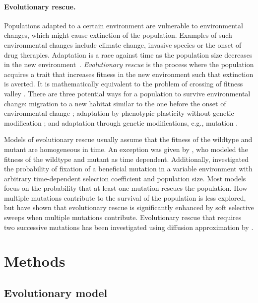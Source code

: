 \documentclass[12pt]{extarticle}
\begin{document}
\paragraph{Evolutionary rescue.} Populations adapted to a certain environment are vulnerable to environmental changes, which might cause extinction of the population. Examples of such environmental changes include climate change, invasive species or the onset of drug therapies. Adaptation is a race against time as the population size decreases in the new environment~\citep{tanaka2022surviving}. 
\emph{Evolutionary rescue} is the process where the population acquires a trait that increases fitness in the new environment such that extinction is averted. It is mathematically equivalent to the problem of crossing of fitness valley \citep{weissman2009rate,weissman2010rate}.
There are three potential ways for a population to survive environmental change: migration to a new habitat similar to the one before the onset of environmental change \citep{cobbold2020should}; adaptation by phenotypic plasticity without genetic modification \citep{carja2019evolutionary,carja2017evolutionary,levien2021non}; and adaptation through genetic modifications, e.g., mutation \citep{uecker2014evolutionary,uecker2016role,uecker2011fixation}.

Models of evolutionary rescue usually assume that the fitness of the wildtype and mutant are homogeneous in time. An exception was given by \citet{marrec2020adapt}, who modeled the fitness of the wildtype and mutant as time dependent. Additionally, \citet{uecker2011fixation} investigated the probability of fixation of a beneficial mutation in a variable environment with arbitrary time-dependent selection coefficient and population size.
Most models focus on the probability that at least one mutation rescues the population. How multiple mutations contribute to the survival of the population is less explored, but \citet{wilson2017soft} have shown that evolutionary rescue is significantly enhanced by soft selective sweeps when multiple mutations contribute. 
Evolutionary rescue that requires two successive mutations has been investigated using diffusion approximation by \citet{martin2013probability}.

\section*{Methods}
\subsection*{Evolutionary model}
\end{document}
